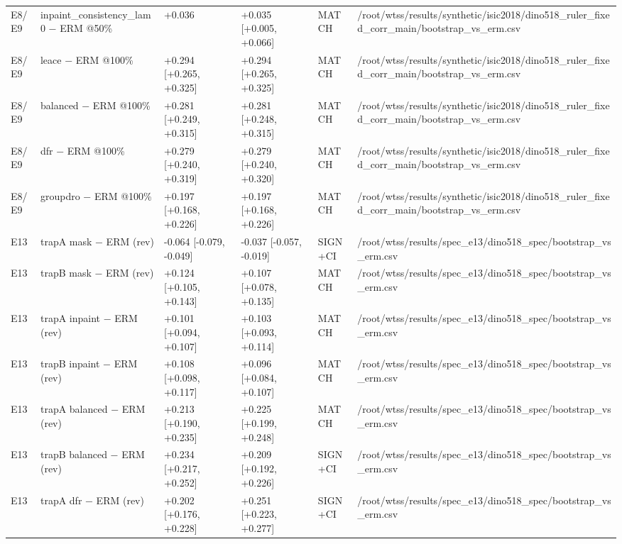 {{\begin{longtable}[]{@{}llllll@{}}
E8/E9 & inpaint\_consistency\_lam0 − ERM @50\% & +0.036 & +0.035 {[}+0.005, +0.066{]} & MATCH & /root/wtss/results/synthetic/isic2018/dino518\_ruler\_fixed\_corr\_main/bootstrap\_vs\_erm.csv \\
E8/E9 & leace − ERM @100\% & +0.294 {[}+0.265, +0.325{]} & +0.294 {[}+0.265, +0.325{]} & MATCH & /root/wtss/results/synthetic/isic2018/dino518\_ruler\_fixed\_corr\_main/bootstrap\_vs\_erm.csv \\
E8/E9 & balanced − ERM @100\% & +0.281 {[}+0.249, +0.315{]} & +0.281 {[}+0.248, +0.315{]} & MATCH & /root/wtss/results/synthetic/isic2018/dino518\_ruler\_fixed\_corr\_main/bootstrap\_vs\_erm.csv \\
E8/E9 & dfr − ERM @100\% & +0.279 {[}+0.240, +0.319{]} & +0.279 {[}+0.240, +0.320{]} & MATCH & /root/wtss/results/synthetic/isic2018/dino518\_ruler\_fixed\_corr\_main/bootstrap\_vs\_erm.csv \\
E8/E9 & groupdro − ERM @100\% & +0.197 {[}+0.168, +0.226{]} & +0.197 {[}+0.168, +0.226{]} & MATCH & /root/wtss/results/synthetic/isic2018/dino518\_ruler\_fixed\_corr\_main/bootstrap\_vs\_erm.csv \\
E13 & trapA mask − ERM (rev) & -0.064 {[}-0.079, -0.049{]} & -0.037 {[}-0.057, -0.019{]} & SIGN+CI & /root/wtss/results/spec\_e13/dino518\_spec/bootstrap\_vs\_erm.csv \\
E13 & trapB mask − ERM (rev) & +0.124 {[}+0.105, +0.143{]} & +0.107 {[}+0.078, +0.135{]} & MATCH & /root/wtss/results/spec\_e13/dino518\_spec/bootstrap\_vs\_erm.csv \\
E13 & trapA inpaint − ERM (rev) & +0.101 {[}+0.094, +0.107{]} & +0.103 {[}+0.093, +0.114{]} & MATCH & /root/wtss/results/spec\_e13/dino518\_spec/bootstrap\_vs\_erm.csv \\
E13 & trapB inpaint − ERM (rev) & +0.108 {[}+0.098, +0.117{]} & +0.096 {[}+0.084, +0.107{]} & MATCH & /root/wtss/results/spec\_e13/dino518\_spec/bootstrap\_vs\_erm.csv \\
E13 & trapA balanced − ERM (rev) & +0.213 {[}+0.190, +0.235{]} & +0.225 {[}+0.199, +0.248{]} & MATCH & /root/wtss/results/spec\_e13/dino518\_spec/bootstrap\_vs\_erm.csv \\
E13 & trapB balanced − ERM (rev) & +0.234 {[}+0.217, +0.252{]} & +0.209 {[}+0.192, +0.226{]} & SIGN+CI & /root/wtss/results/spec\_e13/dino518\_spec/bootstrap\_vs\_erm.csv \\
E13 & trapA dfr − ERM (rev) & +0.202 {[}+0.176, +0.228{]} & +0.251 {[}+0.223, +0.277{]} & SIGN+CI & /root/wtss/results/spec\_e13/dino518\_spec/bootstrap\_vs\_erm.csv \\

\end{longtable}}}
